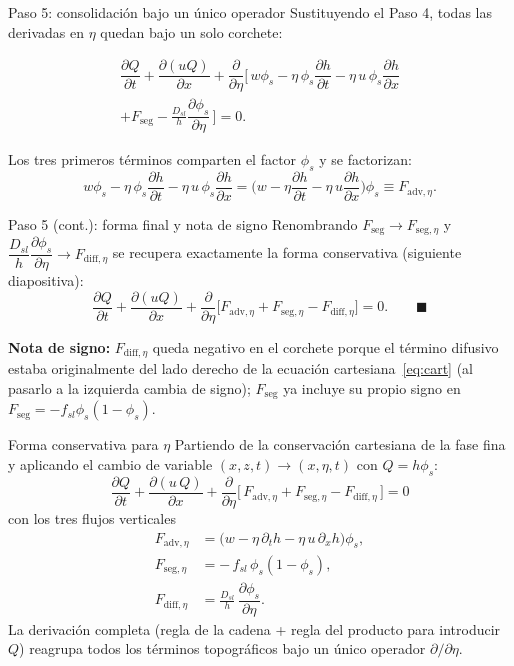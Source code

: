 \documentclass[11pt]{beamer}
\newcommand{\pd}[2]{\dfrac{\partial #1}{\partial #2}}
\begin{document}
\begin{frame}{Paso 5: consolidación bajo un único operador}
Sustituyendo el Paso 4, todas las derivadas en $\eta$ quedan bajo un solo corchete:
\begin{footnotesize}
\begin{multline}
    \pd{Q}{t} + \pd{(uQ)}{x}
    + \pd{}{\eta}\Big[\, w\phi_s - \eta\,\phi_s\pd{h}{t} - \eta\,u\,\phi_s\pd{h}{x} \\
    + F_{\mathrm{seg}} - \frac{D_{sl}}{h}\pd{\phi_s}{\eta} \,\Big] = 0.
\end{multline}
\end{footnotesize}
Los tres primeros términos comparten el factor $\phi_s$ y se factorizan:
\begin{equation}
    w\phi_s - \eta\,\phi_s\pd{h}{t} - \eta\,u\,\phi_s\pd{h}{x}
    = \Big(w - \eta\pd{h}{t} - \eta\,u\pd{h}{x}\Big)\phi_s \equiv F_{\mathrm{adv},\eta}.
\end{equation}
\end{frame}

\begin{frame}{Paso 5 (cont.): forma final y nota de signo}
Renombrando $F_{\mathrm{seg}}\to F_{\mathrm{seg},\eta}$ y $\dfrac{D_{sl}}{h}\dfrac{\partial\phi_s}{\partial\eta}\to F_{\mathrm{diff},\eta}$ se recupera exactamente la forma conservativa (siguiente diapositiva):
\begin{equation}
    \pd{Q}{t} + \pd{(uQ)}{x}
    + \pd{}{\eta}\Big[F_{\mathrm{adv},\eta} + F_{\mathrm{seg},\eta} - F_{\mathrm{diff},\eta}\Big] = 0. \qquad\blacksquare
\end{equation}

\vspace{6pt}
\textbf{Nota de signo:} $F_{\mathrm{diff},\eta}$ queda negativo en el corchete porque el término difusivo estaba originalmente del lado derecho de la ecuación cartesiana~\eqref{eq:cart} (al pasarlo a la izquierda cambia de signo); $F_{\mathrm{seg}}$ ya incluye su propio signo en $F_{\mathrm{seg}}=-f_{sl}\phi_s(1-\phi_s)$.
\end{frame}

\begin{frame}{Forma conservativa para $\eta$}
Partiendo de la conservación cartesiana de la fase fina y aplicando el cambio de variable $(x,z,t)\to(x,\eta,t)$ con $Q=h\phi_s$:
\begin{equation}
    \boxed{\;\pd{Q}{t} + \pd{(u\,Q)}{x}
    + \pd{}{\eta}\Big[\, F_{\mathrm{adv},\eta} + F_{\mathrm{seg},\eta} - F_{\mathrm{diff},\eta} \,\Big] = 0\;}
\end{equation}
con los tres flujos verticales
\begin{align}
    F_{\mathrm{adv},\eta} &= \big(w-\eta\,\partial_t h-\eta\,u\,\partial_x h\big)\phi_s ,\\
    F_{\mathrm{seg},\eta} &= -\,f_{sl}\,\phi_s(1-\phi_s),\\
    F_{\mathrm{diff},\eta} &= \frac{D_{sl}}{h}\,\pd{\phi_s}{\eta}.
\end{align}
La derivación completa (regla de la cadena + regla del producto para introducir $Q$) reagrupa todos los términos topográficos bajo un único operador $\partial/\partial\eta$.
\end{frame}
\end{document}
